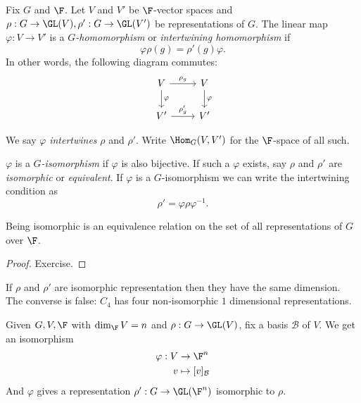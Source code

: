 \documentclass[a4paper]{article}
\theoremstyle{definition}
\begin{document}
\begin{definition}
  Fix \(G\) and \(\F\). Let \(V\) and \(V'\) be \(\F\)-vector spaces and \(\rho: G \to \GL(V), \rho': G \to \GL(V')\) be representations of \(G\). The linear map \(\varphi: V \to V'\) is a \emph{\(G\)-homomorphism} or \emph{intertwining homomorphism} if
  \[
    \varphi \rho(g) = \rho'(g) \varphi.
  \]
  In other words, the following diagram commutes:
  \[
    \begin{tikzcd}
      V \ar[r, "\rho_g"] \ar[d, "\varphi"] & V \ar[d, "\varphi"] \\
      V' \ar[r, "\rho_g'"] & V'
    \end{tikzcd}
  \]

  We say \(\varphi\) \emph{intertwines} \(\rho\) and \(\rho'\). Write \(\Hom_G(V, V')\) for the \(\F\)-space of all such.

  \(\varphi\) is a \emph{\(G\)-isomorphism} if \(\varphi\) is also bijective. If such a \(\varphi\) exists, say \(\rho\) and \(\rho'\) are \emph{isomorphic} or \emph{equivalent}. If \(\varphi\) is a \(G\)-isomorphism we can write the intertwining condition as
  \[
    \rho' = \varphi \rho \varphi^{-1}.
  \]
\end{definition}

\begin{lemma}
  Being isomorphic is an equivalence relation on the set of all representations of \(G\) over \(\F\).
\end{lemma}

\begin{proof}
  Exercise.
\end{proof}

\begin{remark}
  If \(\rho\) and \(\rho'\) are isomorphic representation then they have the same dimension. The converse is false:  \(C_4\) has four non-isomorphic \(1\) dimensional representations.
\end{remark}

\begin{remark}
  Given \(G, V, \F\) with \(\dim_\F V = n\) and \(\rho: G \to \GL(V)\), fix a basis \(\mathcal B\) of \(V\). We get an isomorphism
  \begin{align*}
    \varphi: V &\to \F^n \\
    v &\mapsto [v]_{\mathcal B}
  \end{align*}
  And \(\varphi\) gives a representation \(\rho': G \to \GL(\F^n)\) isomorphic to \(\rho\).
\end{remark}
\end{document}
